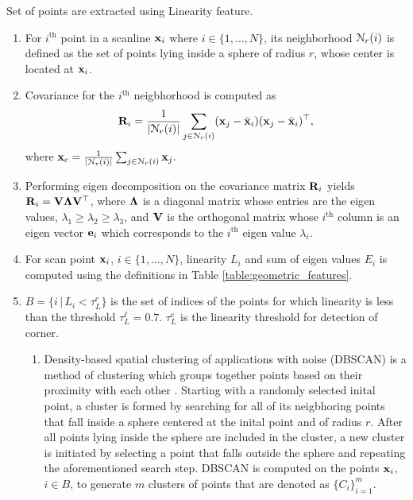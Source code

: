 Set of points are extracted using Linearity feature.

\begin{enumerate}
	\item For $i^{\text{th}}$ point in a scanline $\mathbf{x}_i$ where $i \in \{1,\dots,N\}$, its neighborhood $\EuScript{N}_{r}(i)$ is defined as the set of points lying inside a sphere of radius $r$, whose center is located at $\mathbf{x}_i$.
	\item Covariance for the $i^{\text{th}}$ neigbhorhood is computed as
	\begin{align}
		\mathbf{R}_i = \frac{1}{|\EuScript{N}_{r}(i)|} \sum_{j \in \EuScript{N}_{r}(i)} (\mathbf{x}_j - \bar{\mathbf{x}}_i)(\mathbf{x}_j - \bar{\mathbf{x}}_i)^\top,  
	\end{align}
	where $\mathbf{x}_c = \frac{1}{|\EuScript{N}_{r}(i)| } \sum_{j \in \EuScript{N}_{r}(i)} \mathbf{x}_j.$
	\item Performing eigen decomposition on the covariance matrix $\mathbf{R}_i$ yields $\mathbf{R}_i = \mathbf{V} \boldsymbol{\Lambda} \mathbf{V}^\top$, where $\boldsymbol{\Lambda}$ is a diagonal matrix whose entries are the eigen values, $\lambda_1 \ge \lambda_2 \ge \lambda_3 $, and $\mathbf{V} $ is the orthogonal matrix whose $i^\text{th}$ column is an eigen vector $\mathbf{e}_i$ which corresponds to the $i^\text{th}$ eigen value $\lambda_i$. 
	\item For scan point $\mathbf{x}_i$, $i \in \{1,\dots,N\}$, linearity $L_i$ and sum of eigen values $E_i$ is computed using the definitions in Table \ref{table:geometric_features}.
	\item $B = \{i \, | \, L_i < \tau_L^c \}$ is the set of indices of the points for which linearity is less than the threshold $\tau_L^\ell = 0.7$. $\tau_L^c$ is the linearity threshold for detection of corner.
		\begin{enumerate}
			\item \label{step:DBSCAN} Density-based spatial clustering of applications with noise (DBSCAN) is a method of clustering which groups together points based on their proximity with each other \cite{ester1996density}. 
			Starting with a randomly selected inital point, a cluster is formed by searching for all of its neigbhoring points that fall inside a sphere centered at the inital point and of radius $r$. 
			After all points lying inside the sphere are included in the cluster, a new cluster is initiated by selecting a point that falls outside the sphere and repeating the aforementioned search step. 
			DBSCAN is computed on the points $\mathbf{x}_i$, $i \in B$, to generate $m$ clusters of points that are denoted as $\{C_i\}_{i=1}^m$.

\end{enumerate}
\end{enumerate}
